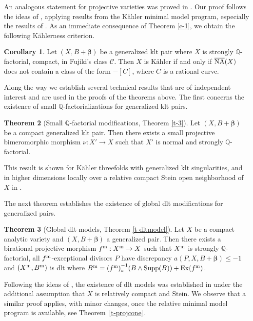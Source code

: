\documentclass[11pt]{amsart}
\numberwithin{equation}{section}
\def\bbeta{\boldsymbol{\beta}}
\newcommand\Q{{\mathbb{Q}}}
\theoremstyle{definition}
\theoremstyle{definition}
\newtheorem{theorem}{Theorem}[section]
\newtheorem{corollary}[theorem]{Corollary}
\theoremstyle{definition}
\begin{document}
An analogous statement for projective varieties was proved in \cite{VP21}. Our proof follows the ideas of \cite{VP21}, applying results from the K\"ahler minimal model program, especially the results of \cite{Fuj22}. %
As an immediate consequence of Theorem \ref{c-1}, we obtain the following K\"ahlerness criterion.

\begin{corollary}\label{c-Kahlercritera}
Let $(X,B+\bbeta)$ be a generalized klt pair where $X$ is strongly $\Q$-factorial, compact, in Fujiki's class
$\mathcal C$. Then $X$ is K\"ahler if and only if $\overline{\rm NA}(X)$ does not
contain a class of the form $-[C]$, where $C$ is a rational curve.
\end{corollary}

Along the way we establish several technical results that are of independent interest and are used in the proofs of the theorems above. The first concerns the existence of small $\Q$-factorializations for generalized klt pairs.

\begin{theorem}[{Small $\Q$-factorial modifications, Theorem \ref{t-3}}]\label{t-smallQfactorial}
Let $(X,B+\bbeta)$ be a compact generalized klt pair. Then there exists
a small projective bimeromorphic morphism $\nu: X'\to X$ such that $X'$ is normal and strongly $\Q$-factorial.
\end{theorem}
This result is shown for K\"ahler threefolds with generalized klt singularities, and in higher dimensions locally over a relative compact Stein open neighborhood of $X$ in \cite{DHY23}.

The next theorem establishes the existence of global dlt modifications for generalized pairs.


\begin{theorem}[{Global dlt models, Theorem \ref{t-dltmodel}}]\label{t-dltmodel-i}Let $X$  be a compact analytic variety and  $(X,B+\bbeta )$ a generalized pair. Then there exists a birational projective morphism $f^{\rm m}:X^{\rm m}\to X$ such that $X^{\rm m}$ is strongly $\Q$-factorial, all $f^{\rm m}$-exceptional divisors $P$ have discrepancy $a(P,X,B+\bbeta)\leq -1$ and
 $(X^{\rm m}, B^{\rm m})$ is dlt where $B^{\rm m}={(f^{\rm m})}^{-1}_*(B\wedge {\rm Supp}(B))+{\rm Ex}(f^{\rm m})$.
\end{theorem}
Following the ideas of \cite{Fil20}, the existence of dlt models was established
in \cite{HP24} under the additional assumption that $X$ is relatively compact
and Stein. We observe that a similar proof applies, with minor changes, once the relative
minimal model program is available, see Theorem~\ref{t-projcone}.
\end{document}
